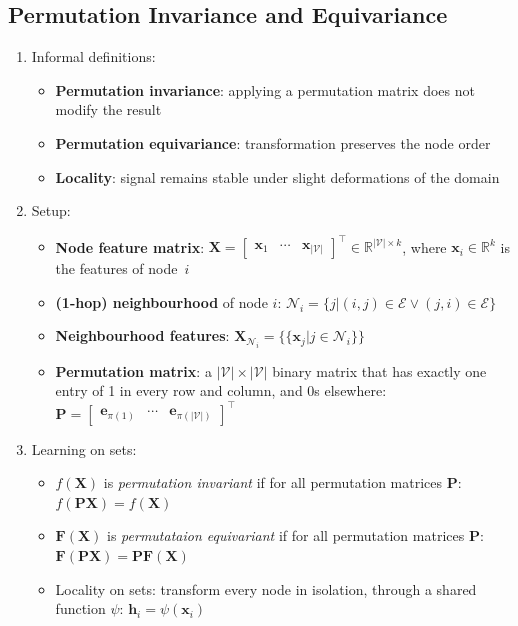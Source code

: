 \documentclass{article}
\begin{document}
\subsection{Permutation Invariance and Equivariance}

\begin{enumerate}
	\item Informal definitions:
	\begin{itemize}[topsep=0pt]
		\item \textbf{Permutation invariance}: applying a permutation matrix does not modify the result
		\item \textbf{Permutation equivariance}: transformation preserves the node order
		\item \textbf{Locality}: signal remains stable under slight deformations of the domain
	\end{itemize}

	\item Setup:
	\begin{itemize}[topsep=0pt]
		\item \textbf{Node feature matrix}: $\mathbf{X}=\begin{bmatrix}
			\mathbf{x}_1 & \cdots & \mathbf{x}_{|\mathcal{V}|}
		\end{bmatrix}^\top\in\mathbb{R}^{|\mathcal{V}|\times k}$, where $\mathbf{x}_i\in\mathbb{R}^k$ is the features of node~$i$
		\item \textbf{(1-hop) neighbourhood} of node $i$: $\mathcal{N}_i=\big\{j\big|(i,j)\in\mathcal{E}\vee(j,i)\in\mathcal{E}\big\}$
		\item \textbf{Neighbourhood features}: $\mathbf{X}_{\mathcal{N}_i}=\{\!\{\mathbf{x}_j|j\in\mathcal{N}_i\}\!\}$
		\item \textbf{Permutation matrix}: a $|\mathcal{V}|\times|\mathcal{V}|$ binary matrix that has exactly one entry of 1 in every row and column, and 0s elsewhere: $\mathbf{P}=\begin{bmatrix}
			\mathbf{e}_{\pi(1)} & \cdots & \mathbf{e}_{\pi(|\mathcal{V}|)}
		\end{bmatrix}^\top$
	\end{itemize}

	\item Learning on sets:
	\begin{itemize}[topsep=0pt]
		\item $f(\mathbf{X})$ is \textit{permutation invariant} if for all permutation matrices $\mathbf{P}$: $f(\mathbf{PX})=f(\mathbf{X})$
		\item $\bm{F}(\mathbf{X})$ is \textit{permutataion equivariant} if for all permutation matrices $\mathbf{P}$: $\bm{F}(\mathbf{PX})=\mathbf{P}\bm{F}(\mathbf{X})$ 
		\item Locality on sets: transform every node in isolation, through a shared function $\psi$: $\mathbf{h}_i=\psi(\mathbf{x}_i)$
		

\end{itemize}
\end{enumerate}
\end{document}
